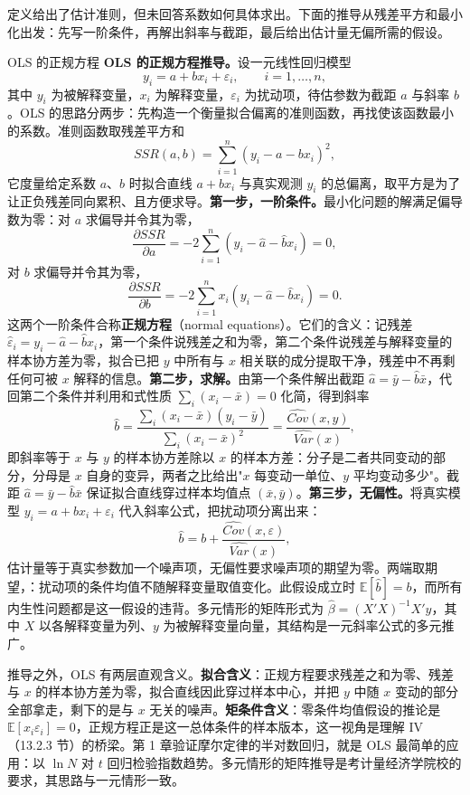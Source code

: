 定义给出了估计准则，但未回答系数如何具体求出。下面的推导从残差平方和最小化出发：先写一阶条件，再解出斜率与截距，最后给出估计量无偏所需的假设。

\begin{derivation}{OLS 的正规方程}{}
\textbf{OLS 的正规方程推导。}设一元线性回归模型
\[
y_i = a + b x_i + \varepsilon_i, \qquad i = 1, \dots, n,
\]
其中 $y_i$ 为被解释变量，$x_i$ 为解释变量，$\varepsilon_i$ 为扰动项，待估参数为截距 $a$ 与斜率 $b$。OLS 的思路分两步：先构造一个衡量拟合偏离的准则函数，再找使该函数最小的系数。准则函数取残差平方和
\[
SSR(a,b) = \sum_{i=1}^{n} (y_i - a - b x_i)^2,
\]
它度量给定系数 $a$、$b$ 时拟合直线 $a + b x_i$ 与真实观测 $y_i$ 的总偏离，取平方是为了让正负残差同向累积、且方便求导。\textbf{第一步，一阶条件。}最小化问题的解满足偏导数为零：对 $a$ 求偏导并令其为零，
\[
\frac{\partial SSR}{\partial a} = -2 \sum_{i=1}^{n} (y_i - \hat a - \hat b x_i) = 0,
\]
对 $b$ 求偏导并令其为零，
\[
\frac{\partial SSR}{\partial b} = -2 \sum_{i=1}^{n} x_i (y_i - \hat a - \hat b x_i) = 0.
\]
这两个一阶条件合称\textbf{正规方程}（normal equations）。它们的含义：记残差 $\hat\varepsilon_i = y_i - \hat a - \hat b x_i$，第一个条件说残差之和为零，第二个条件说残差与解释变量的样本协方差为零，拟合已把 $y$ 中所有与 $x$ 相关联的成分提取干净，残差中不再剩任何可被 $x$ 解释的信息。\textbf{第二步，求解。}由第一个条件解出截距 $\hat a = \bar y - \hat b \bar x$，代回第二个条件并利用和式性质 $\sum_i (x_i - \bar x) = 0$ 化简，得到斜率
\[
\hat b = \frac{\sum_i (x_i - \bar x)(y_i - \bar y)}{\sum_i (x_i - \bar x)^2} = \frac{\widehat{Cov}(x,y)}{\widehat{Var}(x)},
\]
即斜率等于 $x$ 与 $y$ 的样本协方差除以 $x$ 的样本方差：分子是二者共同变动的部分，分母是 $x$ 自身的变异，两者之比给出"$x$ 每变动一单位、$y$ 平均变动多少"。截距 $\hat a = \bar y - \hat b \bar x$ 保证拟合直线穿过样本均值点 $(\bar x, \bar y)$。\textbf{第三步，无偏性。}将真实模型 $y_i = a + b x_i + \varepsilon_i$ 代入斜率公式，把扰动项分离出来：
\[
\hat b = b + \frac{\widehat{Cov}(x, \varepsilon)}{\widehat{Var}(x)},
\]
估计量等于真实参数加一个噪声项，无偏性要求噪声项的期望为零。两端取期望，：扰动项的条件均值不随解释变量取值变化。此假设成立时 $\mathbb{E}[\hat b] = b$，而所有内生性问题都是这一假设的违背。多元情形的矩阵形式为 $\hat\beta = (X'X)^{-1} X'y$，其中 $X$ 以各解释变量为列、$y$ 为被解释变量向量，其结构是一元斜率公式的多元推广。
\end{derivation}

推导之外，OLS 有两层直观含义。\textbf{拟合含义}：正规方程要求残差之和为零、残差与 $x$ 的样本协方差为零，拟合直线因此穿过样本中心，并把 $y$ 中随 $x$ 变动的部分全部拿走，剩下的是与 $x$ 无关的噪声。\textbf{矩条件含义}：零条件均值假设的推论是 $\mathbb{E}[x_i \varepsilon_i] = 0$，正规方程正是这一总体条件的样本版本，这一视角是理解 IV（13.2.3 节）的桥梁。第 1 章验证摩尔定律的半对数回归，就是 OLS 最简单的应用：以 $\ln N$ 对 $t$ 回归检验指数趋势。多元情形的矩阵推导是考计量经济学院校的要求，其思路与一元情形一致。

